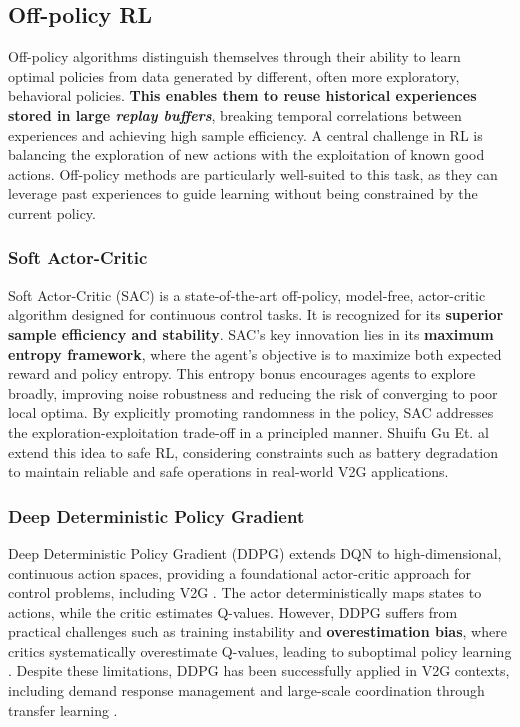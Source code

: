 \subsection{Off-policy RL}

Off-policy algorithms distinguish themselves through their ability to learn optimal policies from data generated by different, often more exploratory, behavioral policies. \textbf{This enables them to reuse historical experiences stored in large \textit{replay buffers}}, breaking temporal correlations between experiences and achieving high sample efficiency. A central challenge in RL is balancing the exploration of new actions with the exploitation of known good actions. Off-policy methods are particularly well-suited to this task, as they can leverage past experiences to guide learning without being constrained by the current policy.

\subsubsection{Soft Actor-Critic}

Soft Actor-Critic (SAC) is a state-of-the-art off-policy, model-free, actor-critic algorithm designed for continuous control tasks. It is recognized for its \textbf{superior sample efficiency and stability}\cite{haarnoja2018soft,haarnoja2019soft}. SAC's key innovation lies in its \textbf{maximum entropy framework}, where the agent's objective is to maximize both expected reward and policy entropy. This entropy bonus encourages agents to explore broadly, improving noise robustness and reducing the risk of converging to poor local optima. 
\noindent
By explicitly promoting randomness in the policy, SAC addresses the exploration-exploitation trade-off in a principled manner. Shuifu Gu Et. al\cite{gu2025optimization} extend this idea to safe RL, considering constraints such as battery degradation to maintain reliable and safe operations in real-world V2G applications.

\subsubsection{Deep Deterministic Policy Gradient}

Deep Deterministic Policy Gradient (DDPG) extends DQN to high-dimensional, continuous action spaces, providing a foundational actor-critic approach for control problems, including V2G \cite{lillicrap2015continuous}. The actor deterministically maps states to actions, while the critic estimates Q-values. However, DDPG suffers from practical challenges such as training instability and \textbf{overestimation bias}, where critics systematically overestimate Q-values, leading to suboptimal policy learning \cite{orfanoudakis2024ev2gym, alfaverh2022optima}. Despite these limitations, DDPG has been successfully applied in V2G contexts, including demand response management \cite{wang2022electrical} and large-scale coordination through transfer learning \cite{Zhang2023}.


